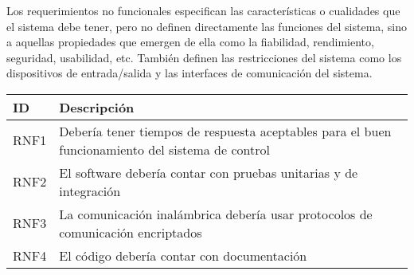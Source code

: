 Los requerimientos no funcionales especifican las características o cualidades que el sistema debe tener, pero no definen directamente las funciones del sistema, sino a aquellas propiedades que emergen de ella como la fiabilidad, rendimiento, seguridad, usabilidad, etc. También definen las restricciones del sistema como los dispositivos de entrada/salida y las interfaces de comunicación del sistema.

\begin{center}
    \begin{tabular} {
        | >{\centering\arraybackslash}m{1cm}
        | >{\centering\arraybackslash}m{13cm}|}
        \hline
            ID & Descripción \\
        \hline
            RNF1 & Debería tener tiempos de respuesta aceptables para el buen funcionamiento del sistema de control \\
        \hline
            RNF2 & El software debería contar con pruebas unitarias y de integración \\
        \hline
            RNF3 & La comunicación inalámbrica debería usar protocolos de comunicación encriptados \\
        \hline
            RNF4 & El código debería contar con documentación \\
        \hline
    \end{tabular}
\end{center}